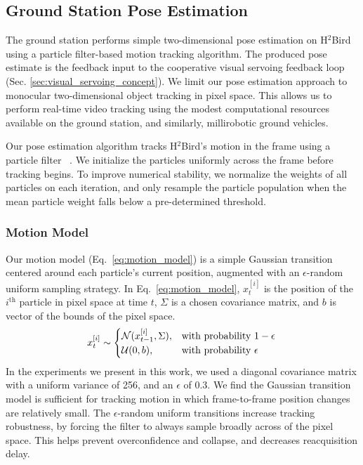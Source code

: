\documentclass{aamas2013}
\begin{document}
\subsection{Ground Station Pose Estimation}
The ground station performs simple two-dimensional pose estimation on 
H$^2$Bird using a particle filter-based motion tracking algorithm.
The produced pose estimate is the feedback input to the cooperative visual servoing feedback 
loop (Sec. \ref{sec:visual_servoing_concept}). We limit our pose estimation 
approach to monocular two-dimensional object tracking in pixel space. This 
allows us to perform real-time video tracking using the modest computational 
resources available on the ground station, and similarly, millirobotic ground 
vehicles.

Our pose estimation algorithm tracks H$^2$Bird's motion in the frame using a particle filter ~\cite{thrun2005probabilistic}. 
We initialize the particles uniformly across the frame before tracking begins. 
To improve numerical stability, we normalize the weights of all particles on 
each iteration, and only resample the particle population when the mean particle 
weight falls below a pre-determined threshold. 

\subsubsection{Motion Model}
Our motion model (Eq.~\ref{eq:motion_model}) is a simple Gaussian transition 
centered around each particle's current position, augmented with an 
$\epsilon$-random uniform sampling strategy. In Eq.~\ref{eq:motion_model}, 
$x^{[i]}_t$ is the position of the $i^\text{th}$ particle in pixel space at time $t$, $\Sigma$ 
is a chosen covariance matrix, and $b$ is vector of the bounds of the pixel space.
\begin{equation}
\label{eq:motion_model}
x^{[i]}_t \sim \begin{cases}
\mathcal{N}(x^{[i]}_{t-1}, \Sigma), &\text{with probability } 1-\epsilon \\
\mathcal{U}(0,b),& \text{with probability } \epsilon \\
\end{cases}\\
\end{equation}
In the experiments we present in this work, we used a diagonal covariance matrix 
with a uniform variance of 256, and an $\epsilon$ of 0.3. We find the Gaussian 
transition model is sufficient for tracking motion in which frame-to-frame 
position changes are relatively small. The $\epsilon$-random uniform 
transitions increase tracking robustness, by forcing the filter to always 
sample broadly across of the pixel space. This helps prevent overconfidence and collapse, 
and decreases reacquisition delay. 
\end{document}
